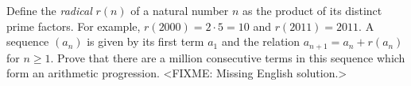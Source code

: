 \problem
Define the \emph{radical} $r(n)$ of a natural number $n$ as the product of its
distinct prime factors.
For example, $r(2000) = 2 \cdot 5 = 10$ and $r(2011) = 2011$.
A sequence $(a_n)$ is given by its first term $a_1$ and the relation
$a_{n + 1} = a_n + r(a_n)$ for $n \geq 1$.
Prove that there are a million consecutive terms in this sequence which form an
arithmetic progression.
\solution
<FIXME: Missing English solution.>
\endproblem
